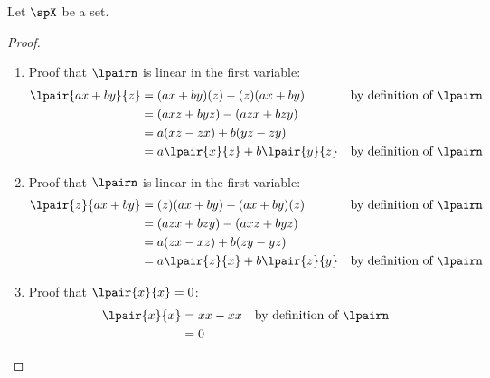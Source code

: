 \begin{example}
Let $\spX$ be a set.
\end{example}
\begin{proof}
\begin{enumerate}
  \item Proof that $\lpairn$ is linear in the first variable:
    \begin{align*}
      \lpair{ax+by}{z}
        &= (ax+by)(z) - (z)(ax+by)
        && \text{by definition of $\lpairn$}
      \\&= (axz+byz) - (azx+bzy)
      \\&= a(xz-zx) + b(yz-zy)
      \\&= a\lpair{x}{z} + b\lpair{y}{z}
        && \text{by definition of $\lpairn$}
    \end{align*}

  \item Proof that $\lpairn$ is linear in the first variable:
    \begin{align*}
      \lpair{z}{ax+by}
        &= (z)(ax+by) - (ax+by)(z)
        && \text{by definition of $\lpairn$}
      \\&= (azx+bzy) - (axz+byz)
      \\&= a(zx-xz) + b(zy-yz)
      \\&= a\lpair{z}{x} + b\lpair{z}{y}
        && \text{by definition of $\lpairn$}
    \end{align*}

  \item Proof that $\lpair{x}{x}=0$:
    \begin{align*}
      \lpair{x}{x}
        &= xx - xx
        && \text{by definition of $\lpairn$}
      \\&= 0
    \end{align*}


\end{enumerate}
\end{proof}
